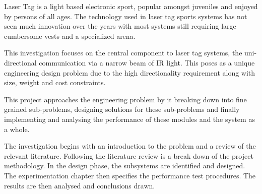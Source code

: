 Laser Tag is a light based electronic sport, popular amongst juveniles and enjoyed by persons of all ages. The technology used in laser tag sports systems has not seen much innovation over the years with most systems still requiring large cumbersome vests and a specialized arena.

This investigation focuses on the central component to laser tag systems, the uni-directional communication via a narrow beam of IR light. This poses as a unique engineering design problem due to the high directionality requirement along with size, weight and cost constraints.

This project approaches the engineering problem by it breaking down into fine grained sub-problems, designing solutions for these sub-problems and finally implementing and analysing the performance of these modules and the system as a whole.

The investigation begins with an introduction to the problem and a review of the relevant literature. Following the literature review is a break down of the project methodology. In the design phase, the subsystems are identified and designed. The experimentation chapter then specifies the performance test procedures. The results are then analysed and conclusions drawn.


